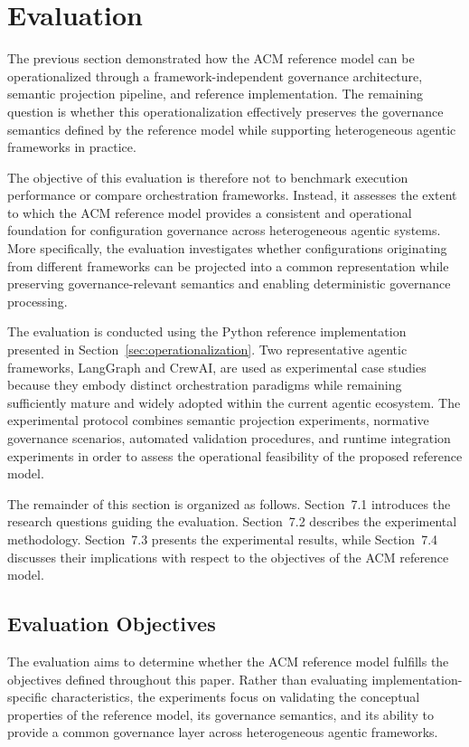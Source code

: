 \documentclass[10pt]{article}
\begin{document}
\section{Evaluation}
\label{sec:evaluation}

The previous section demonstrated how the ACM reference model can be operationalized through a framework-independent governance architecture, semantic projection pipeline, and reference implementation. The remaining question is whether this operationalization effectively preserves the governance semantics defined by the reference model while supporting heterogeneous agentic frameworks in practice.

The objective of this evaluation is therefore not to benchmark execution performance or compare orchestration frameworks. Instead, it assesses the extent to which the ACM reference model provides a consistent and operational foundation for configuration governance across heterogeneous agentic systems. More specifically, the evaluation investigates whether configurations originating from different frameworks can be projected into a common representation while preserving governance-relevant semantics and enabling deterministic governance processing.

The evaluation is conducted using the Python reference implementation presented in Section~\ref{sec:operationalization}. Two representative agentic frameworks, LangGraph and CrewAI, are used as experimental case studies because they embody distinct orchestration paradigms while remaining sufficiently mature and widely adopted within the current agentic ecosystem. The experimental protocol combines semantic projection experiments, normative governance scenarios, automated validation procedures, and runtime integration experiments in order to assess the operational feasibility of the proposed reference model.

The remainder of this section is organized as follows. Section~7.1 introduces the research questions guiding the evaluation. Section~7.2 describes the experimental methodology. Section~7.3 presents the experimental results, while Section~7.4 discusses their implications with respect to the objectives of the ACM reference model.

\subsection{Evaluation Objectives}
\label{sec:evaluation_objectives}

The evaluation aims to determine whether the ACM reference model fulfills the objectives defined throughout this paper. Rather than evaluating implementation-specific characteristics, the experiments focus on validating the conceptual properties of the reference model, its governance semantics, and its ability to provide a common governance layer across heterogeneous agentic frameworks.
\end{document}
